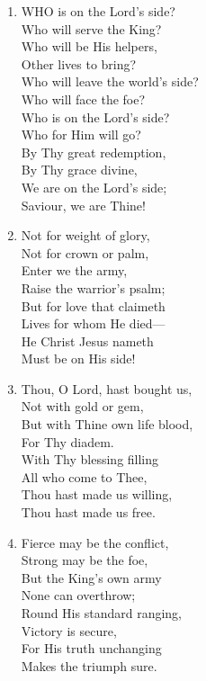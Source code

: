 \begin{enumerate}
    \item WHO is on the Lord's side? \\
        Who will serve the King? \\
        Who will be His helpers, \\
        Other lives to bring? \\
        Who will leave the world's side? \\
        Who will face the foe? \\
        Who is on the Lord's side? \\
        Who for Him will go? \\
        By Thy great redemption, \\
        By Thy grace divine, \\
        We are on the Lord's side; \\
        Saviour, we are Thine!

    \item Not for weight of glory, \\
        Not for crown or palm, \\
        Enter we the army, \\
        Raise the warrior's psalm; \\
        But for love that claimeth \\
        Lives for whom He died--- \\
        He Christ Jesus nameth \\
        Must be on His side!

    \item Thou, O Lord, hast bought us, \\
        Not with gold or gem, \\
        But with Thine own life blood, \\
        For Thy diadem. \\
        With Thy blessing filling \\
        All who come to Thee, \\
        Thou hast made us willing, \\
        Thou hast made us free.

    \item Fierce may be the conflict, \\
        Strong may be the foe, \\
        But the King's own army \\
        None can overthrow; \\
        Round His standard ranging, \\
        Victory is secure, \\
        For His truth unchanging \\
        Makes the triumph sure.

\end{enumerate}

